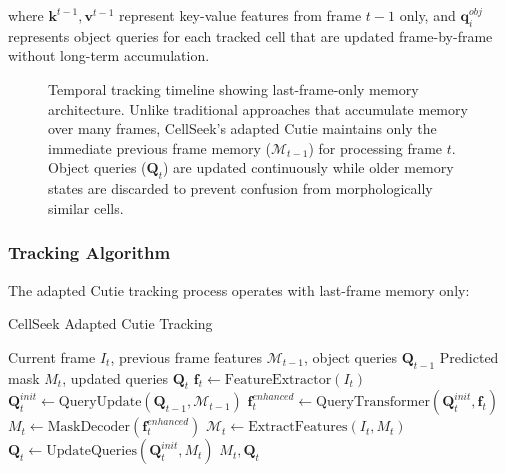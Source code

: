 \documentclass[../cellseek_paper.tex]{subfiles}
\begin{document}
where $\mathbf{k}^{t-1}, \mathbf{v}^{t-1}$ represent key-value features from frame $t-1$ only, and $\mathbf{q}_i^{obj}$ represents object queries for each tracked cell that are updated frame-by-frame without long-term accumulation.

\begin{figure}[H]
  \centering
  
  \caption{Temporal tracking timeline showing last-frame-only memory architecture. Unlike traditional approaches that accumulate memory over many frames, CellSeek's adapted Cutie maintains only the immediate previous frame memory ($\mathcal{M}_{t-1}$) for processing frame $t$. Object queries ($\mathbf{Q}_t$) are updated continuously while older memory states are discarded to prevent confusion from morphologically similar cells.}
  \label{fig:temporal_timeline}
\end{figure}

\subsubsection{Tracking Algorithm}

The adapted Cutie tracking process operates with last-frame memory only:

\begin{algorithm}[H]
  \caption{CellSeek Adapted Cutie Tracking}
  \begin{algorithmic}[1]
    \REQUIRE Current frame $I_t$, previous frame features $\mathcal{M}_{t-1}$, object queries $\mathbf{Q}_{t-1}$
    \ENSURE Predicted mask $M_t$, updated queries $\mathbf{Q}_t$
    \STATE $\mathbf{f}_t \leftarrow \text{FeatureExtractor}(I_t)$
    \STATE $\mathbf{Q}_t^{init} \leftarrow \text{QueryUpdate}(\mathbf{Q}_{t-1}, \mathcal{M}_{t-1})$
    \STATE $\mathbf{f}_t^{enhanced} \leftarrow \text{QueryTransformer}(\mathbf{Q}_t^{init}, \mathbf{f}_t)$
    \STATE $M_t \leftarrow \text{MaskDecoder}(\mathbf{f}_t^{enhanced})$
    \STATE $\mathcal{M}_t \leftarrow \text{ExtractFeatures}(I_t, M_t)$ 
    \STATE $\mathbf{Q}_t \leftarrow \text{UpdateQueries}(\mathbf{Q}_t^{init}, M_t)$
    \RETURN $M_t, \mathbf{Q}_t$
  \end{algorithmic}
\end{algorithm}
\end{document}
